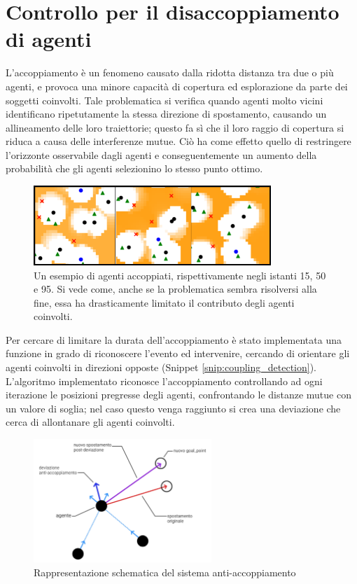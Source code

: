 \section{Controllo per il disaccoppiamento di agenti} \label{sec:controllo_accoppiamento_agenti}

L'accoppiamento è un fenomeno causato dalla ridotta distanza tra due o più agenti, e provoca una minore capacità di copertura ed esplorazione da parte dei soggetti coinvolti.
Tale problematica si verifica quando agenti molto vicini identificano ripetutamente la stessa direzione di spostamento, causando un allineamento delle loro traiettorie; questo fa sì che il loro raggio di copertura si riduca a causa delle interferenze mutue.
Ciò ha come effetto quello di restringere l'orizzonte osservabile dagli agenti e conseguentemente un aumento della probabilità che gli agenti selezionino lo stesso punto ottimo.

\begin{figure}[t]
    \centering
    \includegraphics[width=0.8\textwidth]{img/ch3/agent_coupling_event.png}
    \caption[Esempio di accoppiamento tra agenti]{Un esempio di agenti accoppiati, rispettivamente negli istanti 15, 50 e 95. Si vede come, anche se la problematica sembra risolversi alla fine, essa ha drasticamente limitato il contributo degli agenti coinvolti.}
    \label{fig:agent_coupling_event}
\end{figure}

Per cercare di limitare la durata dell'accoppiamento è stato implementata una funzione in grado di riconoscere l'evento ed intervenire, cercando di orientare gli agenti coinvolti in direzioni opposte (Snippet \ref{snip:coupling_detection}).
\pagebreak
L'algoritmo implementato riconosce l'accoppiamento controllando ad ogni iterazione le posizioni pregresse degli agenti, confrontando le distanze mutue con un valore di soglia; nel caso questo venga raggiunto si crea una deviazione che cerca di allontanare gli agenti coinvolti.

\begin{figure}
    \centering
    \includegraphics[width=0.6\textwidth]{img/ch3/schematic_anticoupling_system.jpg}
    \caption{Rappresentazione schematica del sistema anti-accoppiamento}
    \label{fig:schematic_decoupling_system}
\end{figure}


